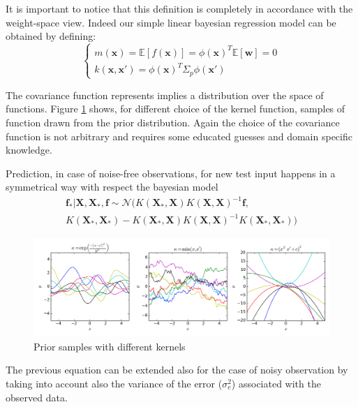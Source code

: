     \noindent It is important to notice that this definition is completely in accordance with the weight-space view. Indeed our
    simple linear bayesian regression model can be obtained by defining:
    \begin{equation}
      \begin{cases}
        m(\pmb{x}) = \mathbb{E}[f(\pmb{x})] = \phi(\pmb{x})^{T} \mathbb{E}[\pmb{w}] = 0 \\
        k(\pmb{x},\pmb{x}') = \phi(\pmb{x})^{T} \Sigma_{p} \phi(\pmb{x}')
      \end{cases}
    \end{equation}

    \noindent The covariance function represents implies a distribution over the space of functions. Figure \ref{function_samples}
    shows, for different choice of the kernel function, samples of function drawn from the prior distribution. Again the choice
    of the covariance function is not arbitrary and requires some educated guesses and domain specific knowledge.\newline

    \noindent Prediction, in case of noise-free observations, for new test input happens in a symmetrical way with respect the bayesian model
    \begin{equation}
      \begin{multlined}
        \pmb{f}_{*} | \pmb{X}, \pmb{X}_{*}, \pmb{f} \sim \mathcal{N}(K(\pmb{X}_{*},\pmb{X})K(\pmb{X},\pmb{X})^{-1}\pmb{f}, \\ K(\pmb{X}_{*},\pmb{X}_{*}) - K(\pmb{X}_{*},\pmb{X}) K(\pmb{X},\pmb{X})^{-1}K(\pmb{X}_{*},\pmb{X}_{*}))
      \end{multlined}
    \end{equation}
    \begin{figure}
      \centering
      \includegraphics[scale=0.45]{images/covGP.png}
      \caption{Prior samples with different kernels}
      \label{function_samples}
    \end{figure}

    \noindent The previous equation can be extended also for the case of noisy observation by taking into account also the
    variance of the error ($\sigma^{2}_{e}$) associated with the observed data. 
